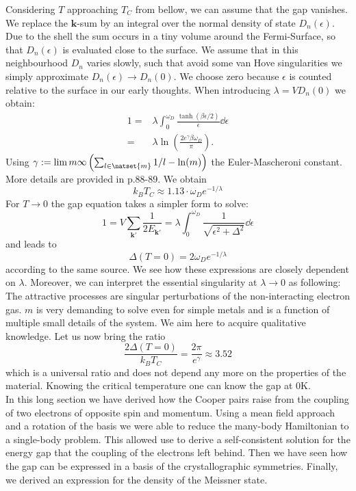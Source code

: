 \documentclass[../main.tex]{subfile}
\begin{document}
Considering $T$ approaching $T_C$ from bellow, we can assume that the gap vanishes. We replace the $\bm{k}$-sum by an integral over the normal 
density of state $D_n(\epsilon)$. Due to the shell the sum occurs in a tiny volume around the Fermi-Surface, so that $D_n(\epsilon)$ is 
evaluated close to the surface. We assume that in this neighbourhood $D_n$ varies slowly, such that avoid some van Hove singularities we 
simply approximate $D_n(\epsilon) \rightarrow D_n(0)$. We choose zero because $\epsilon$ is counted relative to the surface in our early thoughts. 
When introducing $\lambda = V D_n(0)$ we obtain:
\begin{equation*}
    \begin{aligned}
        1 =& \lambda \int_0^{\omega_D} \frac{\tanh\left(\beta\epsilon/2\right)}{\epsilon} \dd \epsilon\\
        =& \lambda \ln\left(\frac{2e^{\gamma}\beta \omega_D}{\pi}\right).
    \end{aligned}
\end{equation*}
Using $\gamma := \lim{m}{\infty} \left(\sum_{l\in\natset{m}} 1/l - \ln(m)\right)$ the Euler-Mascheroni constant. More details are provided
in \cite{FossheimSudbo2004} p.88-89. We obtain 
\[
    k_B T_C \approx 1.13\cdot  \omega_D e^{-1/\lambda}
\]
For $T\rightarrow 0$ the gap equation takes a simpler form to solve:
\begin{equation*}
        1 = V \sum_{\bm{k}'} \frac{1}{2 E_{\bm{k}'}} = \lambda\int_0^{\omega_D}  \frac{1}{\sqrt{\epsilon^2 + \Delta^2}}\dd \epsilon
\end{equation*}
and leads to 
\[
    \Delta(T=0) = 2 \omega_D e^{-1/\lambda}
\]
according to the same source. We see how these expressions are closely dependent on $\lambda$. Moreover, we can interpret the essential singularity
at $\lambda\rightarrow 0$ as following: The attractive processes are singular perturbations of the non-interacting electron gas.
$m$ is very demanding to solve even for simple metals and is a function of multiple small details of the system. We aim here 
to acquire qualitative knowledge. Let us now bring the ratio
\[
    \frac{2\Delta(T=0)}{k_B T_C} = \frac{2 \pi}{e^{\gamma}} \approx 3.52
\]  
which is a universal ratio and does not depend any more on the properties of the material. Knowing the critical temperature one can know
the gap at $0\si{\kelvin}$.\\

In this long section we have derived how the Cooper pairs raise from the coupling of two electrons of opposite spin and momentum. Using a mean field approach
and a rotation of the basis we were able to reduce the many-body Hamiltonian to a single-body problem. This allowed use to derive a self-consistent solution for 
the energy gap that the coupling of the electrons left behind. Then we have seen how the gap can be expressed in a basis of the crystallographic symmetries.
Finally, we derived an expression for the density of the Meissner state.\\
\end{document}
